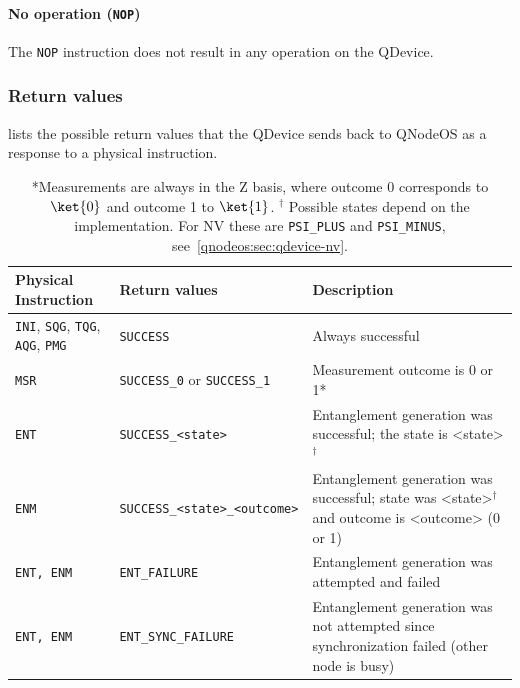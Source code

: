 \paragraph{No operation (\texttt{NOP})}

The \texttt{NOP} instruction does not result in any operation on the \ac{QDevice}.

\subsubsection{Return values}
 lists the possible return values that the QDevice sends back to QNodeOS as a response to a physical instruction.

\begin{table}
    \centering
    \begin{tabularx}{\textwidth}{|l|l|X|}
    \hline
    Physical Instruction & Return values & Description \\ 
    \hline
    \texttt{INI}, \texttt{SQG}, \texttt{TQG}, \texttt{AQG}, \texttt{PMG} & \texttt{SUCCESS} & Always successful \\
    \texttt{MSR} & \texttt{SUCCESS\_0} or \texttt{SUCCESS\_1} & Measurement outcome is 0 or 1* \\ 
    \texttt{ENT} & \texttt{SUCCESS\_<state>} & Entanglement generation was successful; the state is <state>$^\dagger$ \\
    \texttt{ENM} & \texttt{SUCCESS\_<state>\_<outcome>} & Entanglement generation was successful; state was <state>$^\dagger$ and outcome is <outcome> (0 or 1) \\
    \texttt{ENT, ENM} & \texttt{ENT\_FAILURE} & Entanglement generation was attempted and failed \\
    \texttt{ENT, ENM} & \texttt{ENT\_SYNC\_FAILURE} & Entanglement generation was not attempted since synchronization failed (other node is busy) \\
    \hline
    \end{tabularx}
    \caption{*Measurements are always in the Z basis, where outcome 0 corresponds to $\ket{0}$ and outcome 1 to $\ket{1}$. $^\dagger$ Possible states depend on the implementation. For NV these are \texttt{PSI\_PLUS} and \texttt{PSI\_MINUS}, see~\cref{qnodeos:sec:qdevice-nv}.}
    \label{tab:qdevice-return-values}
\end{table}
